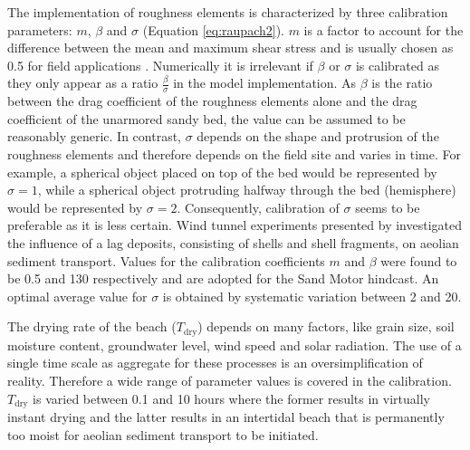 
The implementation of roughness elements is characterized by three
calibration parameters: $m$, $\beta$ and $\sigma$ (Equation
\ref{eq:raupach2}). $m$ is a factor to account for the difference
between the mean and maximum shear stress and is usually chosen as 0.5
for field applications \citep{Raupach1993,
  McKennaNeuman2012}. Numerically it is irrelevant if $\beta$ or
$\sigma$ is calibrated as they only appear as a ratio
$\frac{\beta}{\sigma}$ in the model implementation. As $\beta$ is the
ratio between the drag coefficient of the roughness elements alone and
the drag coefficient of the unarmored sandy bed, the value can be
assumed to be reasonably generic. In contrast, $\sigma$ depends on the
shape and protrusion of the roughness elements and therefore depends
on the field site and varies in time. For example, a spherical object
placed on top of the bed would be represented by $\sigma = 1$, while a
spherical object protruding halfway through the bed (hemisphere) would
be represented by $\sigma = 2$. Consequently, calibration of $\sigma$
seems to be preferable as it is less certain. Wind tunnel experiments
presented by \citet{McKennaNeuman2012} investigated the influence of a
lag deposits, consisting of shells and shell fragments, on aeolian
sediment transport. Values for the calibration coefficients $m$ and
$\beta$ were found to be 0.5 and 130 respectively and are adopted for
the Sand Motor hindcast. An optimal average value for $\sigma$ is
obtained by systematic variation between 2 and 20.

The drying rate of the beach ($T_{\mathrm{dry}}$) depends on many
factors, like grain size, soil moisture content, groundwater level,
wind speed and solar radiation. The use of a single time scale as
aggregate for these processes is an oversimplification of
reality. Therefore a wide range of parameter values is covered in the
calibration. $T_{\mathrm{dry}}$ is varied between 0.1 and 10 hours
where the former results in virtually instant drying and the latter
results in an intertidal beach that is permanently too moist for
aeolian sediment transport to be initiated.

